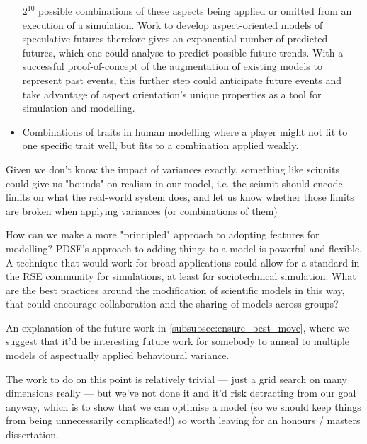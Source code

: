 \begin{itemize}
    \(2^{10}\) possible combinations of these aspects being applied or omitted
    from an execution of a simulation. Work to develop aspect-oriented models of
    speculative futures therefore gives an exponential number of predicted
    futures, which one could analyse to predict possible future trends. With a
    successful proof-of-concept of the augmentation of existing models to
    represent past events, this further step could anticipate future events and
    take advantage of aspect orientation's unique properties as a tool for
    simulation and modelling.
    \item Combinations of traits in human modelling where a player might not fit
    to one specific trait well, but fits to a combination applied weakly.
\end{itemize}



Given we don't know the impact of variances exactly, something like sciunits
could give us "bounds" on realism in our model, i.e. the sciunit should encode
limits on what the real-world system does, and let us know whether those limits
are broken when applying variances (or combinations of them)


How can we make a more "principled" approach to adopting features for modelling?
PDSF's approach to adding things to a model is powerful and flexible. A
technique that would work for broad applications could allow for a standard in
the RSE community for simulations, at least for sociotechnical simulation. What
are the best practices around the modification of scientific models in this way,
that could encourage collaboration and the sharing of models across groups?


An explanation of the future work in \cref{subsubsec:ensure_best_move}, where we
suggest that it'd be interesting future work for somebody to anneal to multiple
models of aspectually applied behavioural variance. 

The work to do on this point is relatively trivial --- just a grid search on
many dimensions really --- but we've not done it and it'd risk detracting from
our goal anyway, which is to show that we can optimise a model (so we should
keep things from being unnecessarily complicated!) so worth leaving for an
honours / masters dissertation.

